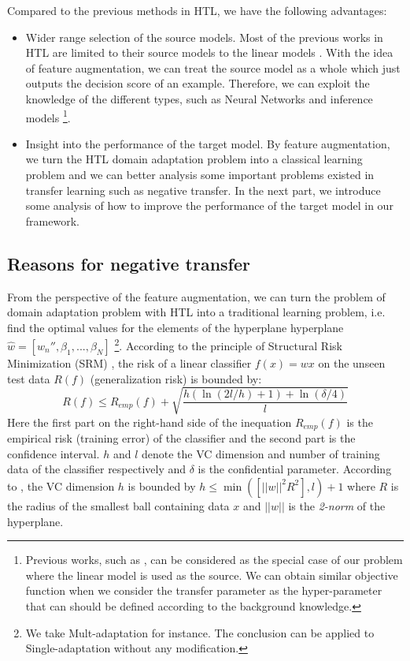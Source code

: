 Compared to the previous methods in HTL, we have the following advantages:
\begin{itemize}
	\item Wider range selection of the source models. Most of the previous works in HTL are limited to their source models to the linear models \cite{tommasi2014learning} \cite{aytar2011tabula}. With the idea of feature augmentation, we can treat the source model as a whole which just outputs the decision score of an example. Therefore, we can exploit the knowledge of the different types, such as Neural Networks and inference models \footnote{Previous works, such as \cite{tommasi2014learning} \cite{aytar2011tabula}, can be considered as the special case of our problem where the linear model is used as the source. We can obtain similar objective function when we consider the transfer parameter as the hyper-parameter that can should be defined according to the background knowledge.}.
	\item Insight into the performance of the target model. By feature augmentation, we turn the HTL domain adaptation problem into a classical learning problem and we can better analysis some important problems existed in transfer learning such as negative transfer. In the next part, we introduce some analysis of how to improve the performance of the target model in our framework. 
\end{itemize}

\subsection{Reasons for negative transfer}
From the perspective of the feature augmentation, we can turn the problem of domain adaptation problem with HTL into a traditional learning problem, i.e. find the optimal values for the elements of the hyperplane hyperplane $\hat{w}=[w_{n}'',\beta_1,...,\beta_N]$ \footnote{We take Mult-adaptation for instance. The conclusion can be applied to Single-adaptation without any modification.}. According to the principle of Structural Risk Minimization (SRM) \cite{vapnik1999overview}, the risk of a linear classifier $f(x)=wx$ on the unseen test data $R(f)$ (generalization risk) is bounded by:
\begin{equation}\label{eq:srm}
R(f) \le {R_{emp}}(f) + \sqrt {\frac{{h(\ln (2l/h) + 1) + \ln (\delta /4)}}{l}} 
\end{equation}
Here the first part on the right-hand side of the inequation ${R_{emp}}(f)$ is the empirical risk (training error) of the classifier and the second part is the confidence interval. $h$ and $l$ denote the VC dimension and number of training data of the classifier respectively and $\delta$ is the confidential parameter. According to \cite{suykens1999least}, the VC dimension $h$ is bounded by $h \le \min([||w||^2R^2],l)+1$ where $R$ is the radius of the smallest ball containing data $x$ and $||w||$ is the \textit{2-norm} of the hyperplane.

